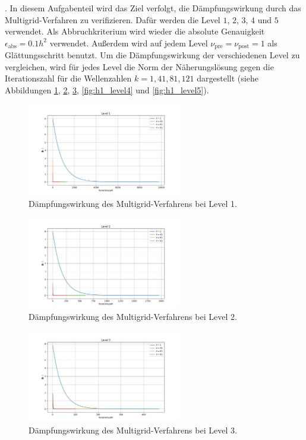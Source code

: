 \documentclass[11pt,a4paper]{article}
\begin{document}
. In diesem Aufgabenteil wird das Ziel verfolgt, die Dämpfungswirkung durch das Multigrid-Verfahren zu verifizieren. Dafür werden die Level $1$, $2$, $3$, $4$ und $5$ verwendet. Als Abbruchkriterium wird wieder die absolute Genauigkeit $\epsilon_{\mathrm{abs}} = 0.1 h^2$ verwendet.
Außerdem wird auf jedem Level $\nu_{\mathrm{pre}} = \nu_{\mathrm{post}} = 1$ als Glättungsschritt benutzt. Um die Dämpfungswirkung der verschiedenen Level zu vergleichen, wird für jedes Level die Norm der Näherungslösung gegen die Iterationszahl für die Wellenzahlen $k = 1, 41, 81, 121$ dargestellt
(siehe Abbildungen \ref{fig:h1_level1}, \ref{fig:h1_level2}, \ref{fig:h1_level3}, \ref{fig:h1_level4} und \ref{fig:h1_level5}).
\begin{figure}[htbp]
    \centering
    \includegraphics[width=0.6\textwidth,scale=0.7]{h1_level1}
    \caption[Dämpfungswirkung des Multigrid-Verfahrens bei Level 1.]{Dämpfungswirkung des Multigrid-Verfahrens bei Level 1.}\label{fig:h1_level1}
\end{figure}
\begin{figure}[htbp]
    \centering
    \includegraphics[width=0.6\textwidth,scale=0.7]{h1_level2}
    \caption[Dämpfungswirkung des Multigrid-Verfahrens bei Level 2.]{Dämpfungswirkung des Multigrid-Verfahrens bei Level 2.}\label{fig:h1_level2}
\end{figure}
\begin{figure}[htbp]
    \centering
    \includegraphics[width=0.6\textwidth,scale=0.7]{h1_level3}
    \caption[Dämpfungswirkung des Multigrid-Verfahrens bei Level 3.]{Dämpfungswirkung des Multigrid-Verfahrens bei Level 3.}\label{fig:h1_level3}
\end{figure}
\end{document}
